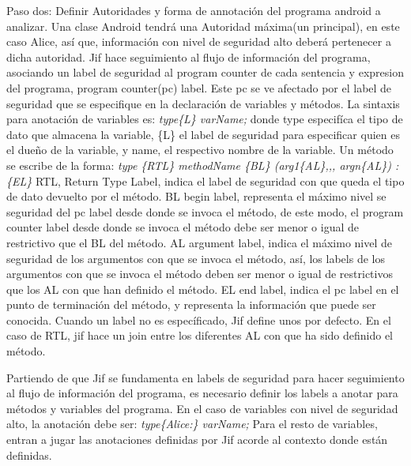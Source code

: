 Paso dos: 
Definir Autoridades y forma de annotación del programa android a analizar.
Una clase Android tendrá una Autoridad máxima(un principal), en este caso Alice,
así que, información con nivel de seguridad alto deberá pertenecer a dicha
autoridad.\newline
Jif hace seguimiento al flujo de información del programa, asociando un label
de seguridad al program counter de cada sentencia y expresion del programa,
program counter(pc) label. Este pc se ve afectado por el label
de seguridad que se especifique en la declaración de variables y
métodos.\newline 
La sintaxis para anotación de variables es: \newline 
\emph{ type\{L\} varName; } \newline donde type especifíca el tipo de dato que
almacena la variable, \{L\} el label de seguridad  para especificar quien es el
dueño de la variable, y name, el respectivo nombre de la variable.\newline 
Un método se escribe de la forma:\newline
\emph{ type \{RTL\} methodName \{BL\} (arg1\{AL\},,, argn\{AL\}) :\{EL\}
}\newline RTL, Return Type Label, indica el label de seguridad con que
queda el tipo de dato devuelto por el método.\newline 
BL begin label, representa el máximo nivel se seguridad del pc label desde donde
se invoca el método, de este modo, el program counter label desde donde
se invoca el método debe ser menor o igual de restrictivo que el BL del
método.\newline 
AL argument label, indica el máximo nivel de seguridad de los argumentos con que
se invoca el método, así, los labels de los argumentos con que se invoca el
método deben ser menor o igual de restrictivos que los AL con que han
definido el método.\newline
EL end label, indica el pc label en el punto de terminación del método, y
representa la información que puede ser conocida.\newline
Cuando un label no es específicado, Jif define unos por defecto. En el caso de
RTL, jif hace un join entre los diferentes AL con que ha sido definido el
método.\newline

Partiendo de que Jif se fundamenta en labels de seguridad para hacer seguimiento
al flujo de información del programa, es necesario definir los labels a
anotar para métodos y variables del programa.\newline
En el caso de variables con nivel de seguridad  alto, la anotación debe
ser:\newline
\emph{ type\{Alice:\} varName; }\newline
Para el resto de variables, entran a jugar las anotaciones definidas por Jif
acorde al contexto donde están definidas.


